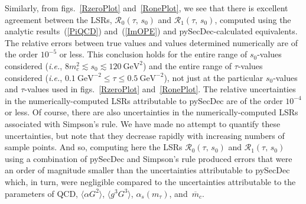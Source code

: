 \documentclass[12pt, letterpaper]{article}
\newcommand{\lsr}{\mathcal{R}}
\newcommand{\vev}[1]{\ensuremath{\langle #1\rangle}}
\newcommand{\aGG}{\vev{\alpha G^2}}
\newcommand{\gggGGG}{\vev{g^3 G^3}}
\newcommand{\gev}{\ensuremath{\text{GeV}}}
\newcommand{\ie}{\textit{i.e.}}
\begin{document}
Similarly, from figs.~\ref{RzeroPlot} and~\ref{RonePlot}, we see that there is excellent 
agreement between the LSRs, $\lsr_0(\tau,\,s_0)$ and $\lsr_1(\tau,\,s_0)$, computed
using the analytic results~(\ref{PiQCD}) and~(\ref{ImOPE}) and pySecDec-calculated 
equivalents.
The relative errors between true values and values determined numerically are of the order $10^{-5}$ or less.
This conclusion holds for the entire range of $s_0$-values considered 
(\ie, $8m_c^2\lesssim s_0 \lesssim 120\ \gev^2$) and the entire range of
$\tau$-values considered (\ie, $0.1\ \gev^{-2}\leq\tau\leq 0.5\ \gev^{-2}$),
not just at the particular $s_0$-values and $\tau$-values used in
figs.~\ref{RzeroPlot} and~\ref{RonePlot}.
The relative uncertainties in the numerically-computed
LSRs attributable to pySecDec are of the order $10^{-4}$ or less.
Of course, there are also uncertainties in the numerically-computed LSRs
associated with Simpson's rule.  We have made no attempt to quantify 
these uncertainties, but note that they decrease rapidly with increasing
numbers of sample points.
And so, 
computing here the LSRs $\lsr_0(\tau,\,s_0)$ and $\lsr_1(\tau,\,s_0)$
using a combination of pySecDec and Simpson's rule 
produced errors that were an order of magnitude smaller than the 
uncertainties attributable to pySecDec which, in turn, were negligible
compared to the uncertainties attributable to the parameters of QCD,
$\aGG$, $\gggGGG$, $\alpha_s(m_{\tau})$, and~$\overline{m}_c$.
\end{document}
